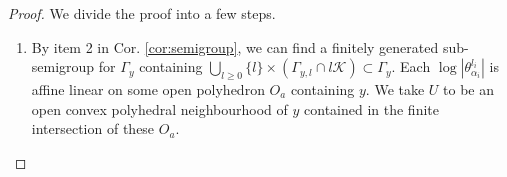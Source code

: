\documentclass[a4paper]{article}
\theoremstyle{definition}
\begin{document}
	
	\begin{proof}
		We divide the proof into a few steps.
		\begin{enumerate}
			\item 
	
	By item 2 in Cor. \ref{cor:semigroup}, we can find a finitely generated sub-semigroup for $\Gamma_y$ containing $ \bigcup_{l\geq 0} \{    l        \} \times (\Gamma_{y,l}\cap l\mathcal{K}) \subset \Gamma_y$.
	Each $\log |\theta_{\alpha_i}^{l_i}|$ is affine linear on some open polyhedron $O_a$ containing $y$. We take $U$ to be an open convex polyhedral neighbourhood of $y$ contained in the finite intersection of these $O_a$.  
	
	
	
	
	

\end{enumerate}
\end{proof}
\end{document}
